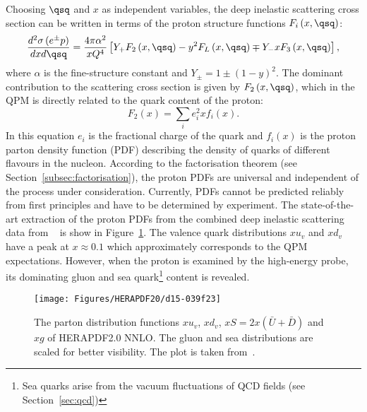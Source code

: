 Choosing $\qsq$ and $x$ as independent variables, the deep inelastic scattering cross section can be written in terms of the proton structure functions $F_i\left(x,\qsq\right)$:
\begin{equation}
\frac{d^2\sigma\left( e^\pm p \right) }{dxd\qsq} = \frac{4\pi\alpha^2}{xQ^4}\left[ Y_+F_2\left(x,\qsq\right) - y^2F_L\left(x,\qsq\right) \mp Y_-xF_3\left(x,\qsq\right) \right],
\label{eq:ddifDIS}
\end{equation}
where $\alpha$ is the fine-structure constant and $Y_\pm = 1 \pm \left( 1 - y \right)^2$. The dominant contribution to the scattering cross section is given by $F_2\left(x,\qsq\right)$, which in the QPM is directly related to the quark content of the proton:
\begin{equation}
F_2\left(x\right) = \sum_i{e_i^2xf_i\left(x\right)}.
\label{eq:f2pdf}
\end{equation}
In this equation $e_i$ is the fractional charge of the quark and $f_i\left(x\right)$ is the proton parton density function (PDF) describing the density of quarks of different flavours in the nucleon. According to the factorisation theorem (see Section~\ref{subsec:factorisation}), the proton PDFs are universal and independent of the process under consideration. Currently, PDFs cannot be predicted reliably from first principles and have to be determined by experiment. The state-of-the-art extraction of the proton PDFs from the combined deep inelastic scattering data from \hera~\cite{Abramowicz:2015mha} is show in Figure~\ref{fig:d15-039f23}. The valence quark distributions $xu_v$ and $xd_v$ have a peak at $x\approx 0.1$ which approximately corresponds to the QPM expectations. However, when the proton is examined by the high-energy probe, its dominating gluon and sea quark\footnote{Sea quarks arise from the vacuum fluctuations of QCD fields (see Section~\ref{sec:qcd})} content is revealed.
\begin{figure}[t!]
	\centering
		\texttt{[image: Figures/HERAPDF20/d15-039f23]}
	\caption{The parton distribution functions $xu_v$, $xd_v$, $xS=2x\left(\bar{U}+\bar{D}\right)$ and $xg$ of HERAPDF2.0 NNLO. The gluon and sea distributions are scaled for better visibility. The plot is taken from~\protect\cite{Abramowicz:2015mha}.}
	\label{fig:d15-039f23}
\end{figure}

